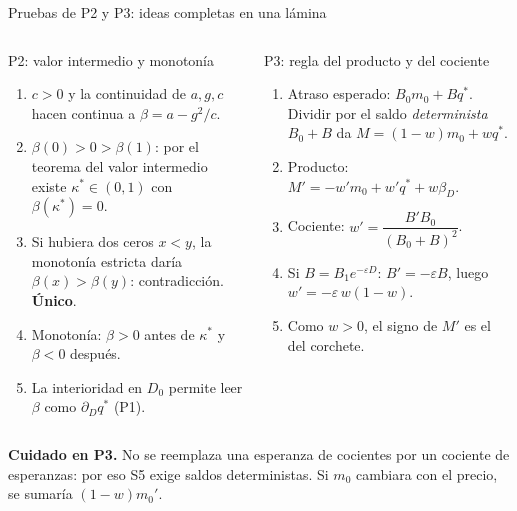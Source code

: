 \documentclass[aspectratio=169,10pt,t]{beamer}
\newcommand{\qs}{q^{*}}
\begin{document}
\begin{frame}{Pruebas de P2 y P3: ideas completas en una lámina}
\begin{columns}[T,onlytextwidth]
\begin{propbox}{P2: valor intermedio y monotonía}
\footnotesize
\begin{enumerate}\setlength{\itemsep}{.5mm}
\item $c>0$ y la continuidad de $a,g,c$ hacen continua a $\beta=a-g^{2}/c$.
\item $\beta(0)>0>\beta(1)$: por el teorema del valor intermedio existe
$\kappa^{*}\in(0,1)$ con $\beta(\kappa^{*})=0$.
\item Si hubiera dos ceros $x<y$, la monotonía estricta daría
$\beta(x)>\beta(y)$: contradicción. \textbf{Único}.
\item Monotonía: $\beta>0$ antes de $\kappa^{*}$ y $\beta<0$ después.
\item La interioridad en $D_{0}$ permite leer $\beta$ como $\partial_{D}\qs$ (P1).
\end{enumerate}
\end{propbox}
\begin{propbox}{P3: regla del producto y del cociente}
\footnotesize
\begin{enumerate}\setlength{\itemsep}{.5mm}
\item Atraso esperado: $B_{0}m_{0}+B\qs$. Dividir por el saldo
\emph{determinista} $B_{0}+B$ da $M=(1-w)m_{0}+w\qs$.
\item Producto: $M'=-w'm_{0}+w'\qs+w\beta_{D}$.
\item Cociente: $w'=\dfrac{B'B_{0}}{(B_{0}+B)^{2}}$.
\item Si $B=B_{1}e^{-\varepsilon D}$: $B'=-\varepsilon B$, luego
$w'=-\varepsilon\,w(1-w)$.
\item Como $w>0$, el signo de $M'$ es el del corchete.
\end{enumerate}
\end{propbox}
\end{columns}
\vspace{.5mm}
\begin{plainbox}\footnotesize
\textbf{Cuidado en P3.} No se reemplaza una esperanza de cocientes por un cociente de
esperanzas: por eso S5 exige saldos deterministas. Si $m_{0}$ cambiara con el
precio, se sumaría $(1-w)m_{0}'$.
\end{plainbox}
\end{frame}
\end{document}
